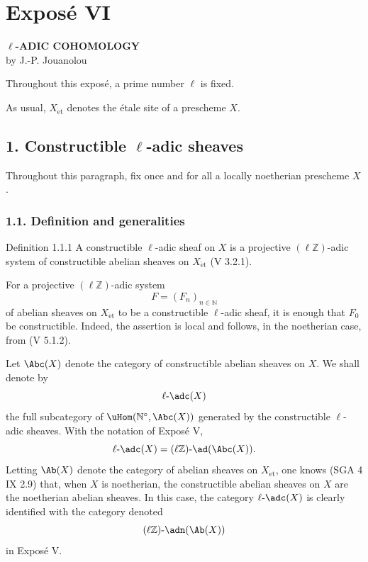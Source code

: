 \section*{Exposé VI}

\begin{center}
\textbf{\(\ell\)-ADIC COHOMOLOGY}\\[0.5em]
by J.-P. Jouanolou
\end{center}

Throughout this exposé, a prime number \(\ell\) is fixed.

As usual, \(X_{\mathrm{\acute et}}\) denotes the étale site of a prescheme \(X\).

\subsection*{1. Constructible \(\ell\)-adic sheaves}

Throughout this paragraph, fix once and for all a locally noetherian prescheme \(X\).

\subsubsection*{1.1. Definition and generalities}

\begin{statement}{Definition 1.1.1}
A constructible \(\ell\)-adic sheaf on \(X\) is a projective \((\ell\mathbb Z)\)-adic system of constructible abelian sheaves on \(X_{\mathrm{\acute et}}\) (V 3.2.1).
\end{statement}

For a projective \((\ell\mathbb Z)\)-adic system
\[
F=(F_n)_{n\in\mathbb N}
\]
of abelian sheaves on \(X_{\mathrm{\acute et}}\) to be a constructible \(\ell\)-adic sheaf, it is enough that \(F_0\) be constructible. Indeed, the assertion is local and follows, in the noetherian case, from (V 5.1.2).

Let \(\Abc(X)\) denote the category of constructible abelian sheaves on \(X\). We shall denote by
\[
\ell\text{-}\adc(X)
\]
the full subcategory of \(\uHom(\mathbb N^\circ,\Abc(X))\) generated by the constructible \(\ell\)-adic sheaves. With the notation of Exposé V,
\[
\ell\text{-}\adc(X)=(\ell\mathbb Z)\text{-}\ad(\Abc(X)).
\]
Letting \(\Ab(X)\) denote the category of abelian sheaves on \(X_{\mathrm{\acute et}}\), one knows (SGA 4 IX 2.9) that, when \(X\) is noetherian, the constructible abelian sheaves on \(X\) are the noetherian abelian sheaves. In this case, the category \(\ell\text{-}\adc(X)\) is clearly identified with the category denoted
\[
(\ell\mathbb Z)\text{-}\adn(\Ab(X))
\]
in Exposé V.

